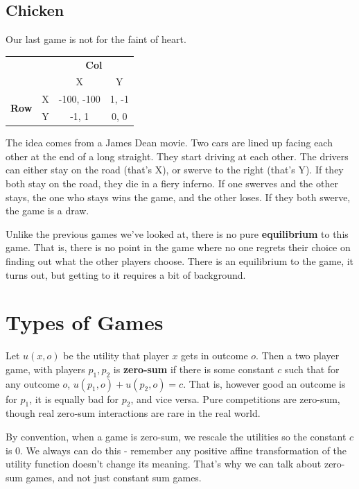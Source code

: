 \documentclass[openany]{book}
\begin{document}
\subsection{Chicken}
Our last game is not for the faint of heart.
\begin{center}
\begin{tabular}{l r | c c}
 & & \multicolumn{2}{c}{\textbf{Col}} \\
& & X & Y \\ \hline
\multirow{2}{*}{\textbf{Row}} & X & -100, -100 & 1, -1 \\ & Y & -1, 1 & 0, 0 \\
\end{tabular}
\end{center}
The idea comes from a James Dean movie. Two cars are lined up facing each other at the end of a long straight. They start driving at each other. The drivers can either stay on the road (that's X), or swerve to the right (that's Y). If they both stay on the road, they die in a fiery inferno. If one swerves and the other stays, the one who stays wins the game, and the other loses. If they both swerve, the game is a draw. 

Unlike the previous games we've looked at, there is no pure \textbf{equilibrium} to this game. That is, there is no point in the game where no one regrets their choice on finding out what the other players choose. There is an equilibrium to the game, it turns out, but getting to it requires a bit of background.

\section{Types of Games}

Let $u(x, o)$ be the utility that player $x$ gets in outcome $o$. Then a two player game, with players $p_1, p_2$ is \textbf{zero-sum} if there is some constant $c$ such that for any outcome $o$, $u(p_1, o) + u(p_2, o) = c$. That is, however good an outcome is for $p_1$, it is equally bad for $p_2$, and vice versa. Pure competitions are zero-sum, though real zero-sum interactions are rare in the real world.

By convention, when a game is zero-sum, we rescale the utilities so the constant $c$ is 0. We always can do this - remember any positive affine transformation of the utility function doesn't change its meaning. That's why we can talk about zero-sum games, and not just constant sum games.
\end{document}
